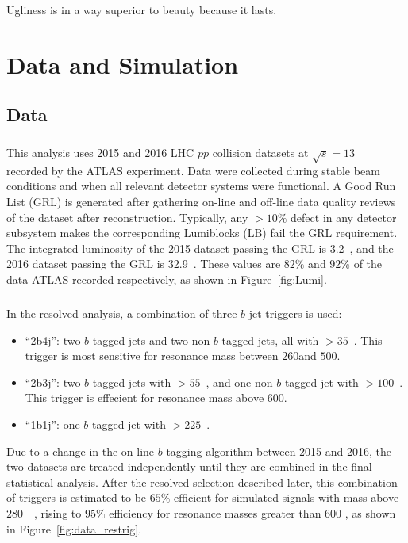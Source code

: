 \begin{savequote}[75mm]
Ugliness is in a way superior to beauty because it lasts.
\end{savequote}
\chapter{Data and Simulation}
%

\section{Data}
\label{sec:data}
\paragraph{}
This analysis uses 2015 and 2016 LHC $pp$ collision datasets at $\sqrt{s} = 13$~\TeV~ recorded by the ATLAS experiment. Data were collected during stable beam conditions and when all relevant detector systems were functional. A Good Run List (GRL) is generated after gathering on-line and off-line data quality reviews of the dataset after reconstruction. Typically, any $> 10\%$ defect in any detector subsystem makes the corresponding Lumiblocks (LB) fail the GRL requirement. The integrated luminosity of the 2015 dataset passing the GRL is 3.2~\ifb, and the 2016 dataset passing the GRL is 32.9~\ifb. These values are $82\%$ and $92\%$ of the data ATLAS recorded respectively, as shown in Figure~\ref{fig:Lumi}.

\paragraph{}
In the resolved analysis, a combination of three $b$-jet triggers is used:
\begin{itemize}
	\item ``2b4j'': two $b$-tagged jets and two non-$b$-tagged jets, all with \pt$>35$~\GeV. This trigger is most sensitive for resonance mass between $260$\GeV and $500$\GeV.
	\item ``2b3j'': two $b$-tagged jets with \pt$>55$~\GeV, and one non-$b$-tagged jet with \pt$>100$~\GeV. This trigger is effecient for resonance mass above $600$\GeV.
	\item ``1b1j'': one $b$-tagged jet with \pt$>225$~\GeV.
\end{itemize}
Due to a change in the on-line $b$-tagging algorithm between 2015 and 2016, the two datasets are treated independently until they are combined in the final statistical analysis. 
After the resolved selection described later, this combination of triggers is estimated to be $65\%$ efficient for simulated signals with mass above $280$~\GeV~, rising to $95\%$ efficiency for resonance masses greater than $600$ \GeV, as shown in Figure~\ref{fig:data_restrig}.

